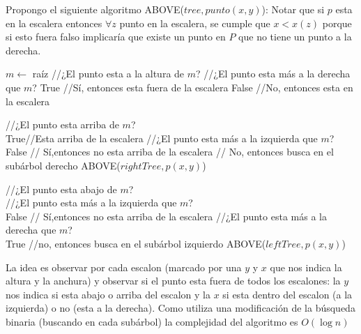 \begin{enumerate}
    Propongo el siguiente algoritmo ABOVE($tree,punto(x,y)$): 
    Notar que si $p$ esta en la escalera entonces $\forall z$ punto en la escalera, se cumple que $x < x(z)$ porque si esto fuera falso implicaría que existe un punto en $P$ que no tiene un punto a la derecha.
    \begin{algorithmic}[1]
        \State $m \gets$ raíz
         //¿El punto esta a la altura de $m$?
             //¿El punto esta más a la derecha que $m$?
                \State
                \Return True
                \State //Sí, entonces esta fuera de la escalera
            \Else
                \State
                \Return False
                \State //No, entonces esta en la escalera
            \EndIf
        \EndIf


         //¿El punto esta arriba de $m$?
            \\
                \Return True//Esta arriba de la escalera
            \Else
                 //¿El punto esta más a la izquierda que $m$?\\
                    \Return False // Sí,entonces no esta arriba de la escalera
                    \State // No, entonces busca en el subárbol derecho
                    \State ABOVE($rightTree,p(x,y)$)
                \EndIf
            \EndIf
        \EndIf

         //¿El punto esta abajo de $m$?
            \\
                 //¿El punto esta más a la izquierda que $m$?\\
                    \Return False // Sí,entonces no esta arriba de la escalera
                //¿El punto esta más a la derecha que $m$?\\
                    \Return True
                \EndIf
            \Else
                \State //no, entonces busca en el subárbol izquierdo
                \State ABOVE($leftTree,p(x,y)$)
            \EndIf
        \EndIf
    \end{algorithmic}

    La idea es observar por cada escalon (marcado por una $y$ y $x$ que nos indica la altura y la anchura) y observar si el punto esta fuera de todos los escalones: la $y$ nos indica si esta abajo o arriba del escalon y la $x$ si esta dentro del escalon (a la izquierda) o no (esta a la derecha). Como utiliza una modificación de la búsqueda binaria (buscando en cada subárbol) la complejidad del algoritmo es $O(\log n)$
\end{enumerate}
\bigskip
